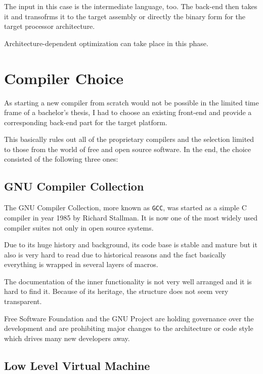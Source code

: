         The input in this case is the intermediate language, too. The back-end then takes it and transofrms it to the target assembly or directly the binary form for the target processor architecture.

        Architecture-dependent optimization can take place in this phase.

\chapter{Compiler Choice}\label{compiler}

As starting a new compiler from scratch would not be possible in the limited time frame of a bachelor's thesis, I had to choose an existing front-end and provide a corresponding back-end part for the target platform.

This basically rules out all of the proprietary compilers and the selection limited to those from the world of free and open source software. In the end, the choice consisted of the following three ones:


    \section{GNU Compiler Collection}\label{gcc}

    The GNU Compiler Collection, more known as \texttt{GCC}, was started as a simple C compiler in year 1985 by Richard Stallman. It is now one of the most widely used compiler suites not only in open source systems.

    Due to its huge history and background, its code base is stable and mature but it also is very hard to read due to historical reasons and the fact basically everything is wrapped in several layers of macros.

    The documentation of the inner functionality is not very well arranged and it is hard to find it. Because of its heritage, the structure does not seem very transparent.

    Free Software Foundation and the GNU Project are holding governance over the development and are prohibiting major changes to the architecture or code style which drives many new developers away.

    \section{Low Level Virtual Machine}\label{llvm}

